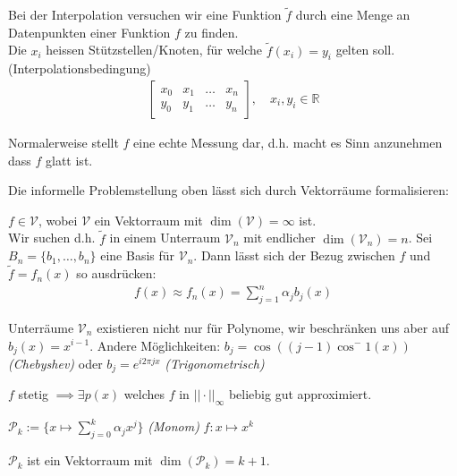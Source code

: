 Bei der Interpolation versuchen wir eine Funktion $\tilde{f}$ durch eine Menge an Datenpunkten einer Funktion $f$ zu finden.\\
Die $x_i$ heissen Stützstellen/Knoten, für welche $\tilde{f}(x_i) = y_i$ gelten soll. (Interpolationsbedingung)
\begin{align*}
	\begin{bmatrix}
		x_0 & x_1 & \ldots & x_n \\
		y_0 & y_1 & \ldots & y_n
	\end{bmatrix},
	\quad x_i, y_i \in \mathbb{R}
\end{align*}

Normalerweise stellt $f$ eine echte Messung dar, d.h. macht es Sinn anzunehmen dass $f$ glatt ist.

Die informelle Problemstellung oben lässt sich durch Vektorräume formalisieren:

$f \in \mathcal{V}$, wobei $\mathcal{V}$ ein Vektorraum mit $\dim(\mathcal{V}) = \infty$ ist. \\
Wir suchen d.h. $\tilde{f}$ in einem Unterraum $\mathcal{V}_n$ mit endlicher $\dim(\mathcal{V}_n) = n$.
Sei $B_n = \{b_1,\ldots,b_n\}$ eine Basis für $\mathcal{V}_n$.
Dann lässt sich der Bezug zwischen $f$ und $\tilde{f} = f_n(x)$ so ausdrücken:
\begin{align*}
	f(x) \approx f_n(x) = \sum_{j=1}^n \alpha_j b_j(x)
\end{align*}

\setcounter{all}{2}
\inlineremark Unterräume $\mathcal{V}_n$ existieren nicht nur für Polynome, wir beschränken uns aber auf $b_j(x) = x^{i-1}$.
Andere Möglichkeiten: $b_j = \cos((j-1)\cos^-1(x))$ \textit{(Chebyshev)} oder $b_j = e^{i2\pi j x}$ \textit{(Trigonometrisch)}


\setcounter{all}{5}
 $f$ stetig $\implies \exists p(x)$ welches $f$ in $||\cdot||_\infty$ beliebig gut approximiert.

\setcounter{all}{7}
 $\mathcal{P}_k := \{ x \mapsto \sum_{j = 0}^{k} \alpha_j x^j \}$
\inlinedef \textit{(Monom)} $f: x \mapsto x^k$

 $\mathcal{P}_k$ ist ein Vektorraum mit $\dim(\mathcal{P}_k) = k+1$.
